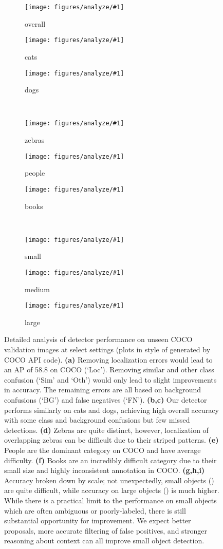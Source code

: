 \documentclass{bmvc2k}
\newcommand{\Caption}[1]{\caption{\small#1}}
\newcommand{\AP}[1]{AP\xspace}
\begin{document}
\newcommand{\incp}[2]{\begin{subfigure}[b]{0.315\textwidth}\centering
 \texttt{[image: figures/analyze/\#1]}
 \vspace{-5mm}\Caption{#2}\label{fig:analyze:#1}\end{subfigure}}
\begin{figure}[t]\centering
 \incp{overall-all-all}{overall}\hspace{2mm}
 \incp{animal-cat-all}{cats}\hspace{2mm}
 \incp{animal-dog-all}{dogs}\vspace{2mm}\\
 \incp{animal-zebra-all}{zebras}\hspace{2mm}
 \incp{person-person-all}{people}\hspace{2mm}
 \incp{indoor-book-all}{books}\vspace{2mm}\\
 \incp{overall-all-small}{small}\hspace{2mm}
 \incp{overall-all-medium}{medium}\hspace{2mm}
 \incp{overall-all-large}{large}\hspace{2mm}
\Caption{Detailed analysis of detector performance on unseen COCO validation images at select settings (plots in style of \cite{hoiem2012diagnosing} generated by COCO API code). {\bf(a)} Removing localization errors would lead to an \AP{10} of 58.8 on COCO (`Loc'). Removing similar and other class confusion (`Sim' and `Oth') would only lead to slight improvements in accuracy. The remaining errors are all based on background confusions (`BG') and false negatives (`FN'). {\bf(b,c)} Our detector performs similarly on cats and dogs, achieving high overall accuracy with some class and background confusions but few missed detections. {\bf(d)} Zebras are quite distinct, however, localization of overlapping zebras can be difficult due to their striped patterns. {\bf(e)} People are the dominant category on COCO and have average difficulty. {\bf(f)} Books are an incredibly difficult category due to their small size and highly inconsistent annotation in COCO. {\bf(g,h,i)} Accuracy broken down by scale; not unexpectedly, small objects () are quite difficult, while accuracy on large objects () is much higher. While there is a practical limit to the performance on small objects which are often ambiguous or poorly-labeled, there is still substantial opportunity for improvement. We expect better proposals, more accurate filtering of false positives, and stronger reasoning about context can all improve small object detection.}
\label{fig:analysis}
\end{figure}
\clearpage
\end{document}
